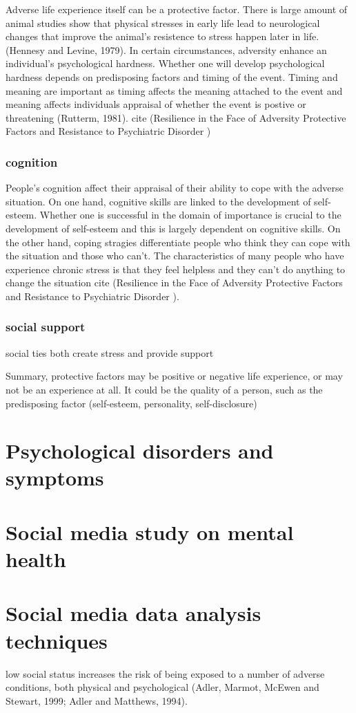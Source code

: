 Adverse life experience itself can be a protective factor. There is large amount of animal studies show that physical stresses in early life lead to neurological changes that improve the animal's resistence to stress happen later in life. (Hennesy and Levine, 1979). In certain circumstances, adversity enhance an individual's psychological hardness. Whether one will develop psychological hardness depends on predisposing factors and timing of the event. Timing and meaning are important as timing affects the meaning attached to the event and meaning affects individuals appraisal of whether the event is postive or threatening (Rutterm, 1981). cite (Resilience in the Face of Adversity Protective Factors and Resistance to Psychiatric Disorder )

\subsubsection{cognition}
People's cognition affect their appraisal of their ability to cope with the adverse situation. On one hand, cognitive skills are linked to the development of self-esteem. Whether one is successful in the domain of importance is crucial to the development of self-esteem and this is largely dependent on cognitive skills. On the other hand, coping stragies differentiate people who think they can cope with the situation and those who can't. The characteristics of many people who have experience chronic stress is that they feel helpless and they can't do anything to change the situation cite (Resilience in the Face of Adversity Protective Factors and Resistance to Psychiatric Disorder ). 


\subsubsection{social support}
social ties both create stress and provide support



Summary, protective factors may be positive or negative life experience, or may not be an experience at all. It could be the quality of a person, such as the predisposing factor  (self-esteem, personality, self-disclosure)


\section{Psychological disorders and symptoms}



\section{Social media study on mental health}



\section{Social media data analysis techniques}

low social status increases the risk of being exposed to a number of adverse conditions, both physical and psychological (Adler, Marmot, McEwen and Stewart, 1999; Adler and Matthews, 1994). 











